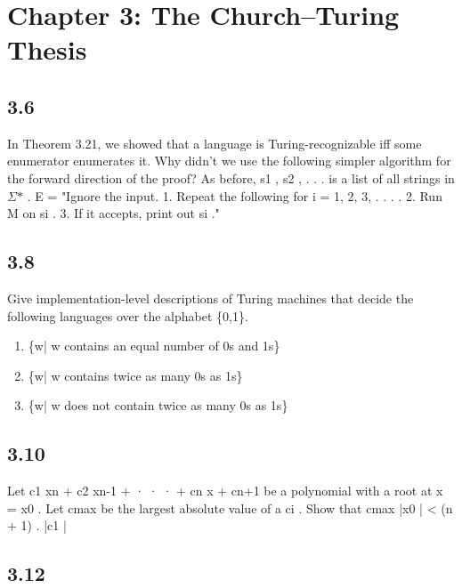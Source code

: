 \section*{Chapter 3: The Church--Turing Thesis}

\subsection*{3.6}

In Theorem 3.21, we showed that a language is Turing-recognizable iff some enumerator enumerates it. Why didn't we use the following simpler algorithm for the forward direction of the proof? As before, s1 , s2 , . . . is a list of all strings in $\Sigma$$\ast$ . E = "Ignore the input. 1. Repeat the following for i = 1, 2, 3, . . . . 2. Run M on si . 3. If it accepts, print out si ."


\subsection*{3.8}

Give implementation-level descriptions of Turing machines that decide the following languages over the alphabet \{0,1\}.

\begin{enumerate}[label=(\alph*), leftmargin=2.5em]

\item \{w| w contains an equal number of 0s and 1s\}

\item \{w| w contains twice as many 0s as 1s\}

\item \{w| w does not contain twice as many 0s as 1s\}

\end{enumerate}


\subsection*{3.10}

Let c1 xn + c2 xn-1 + · · · + cn x + cn+1 be a polynomial with a root at x = x0 . Let cmax be the largest absolute value of a ci . Show that cmax |x0 | < (n + 1) . |c1 |


\subsection*{3.12}

